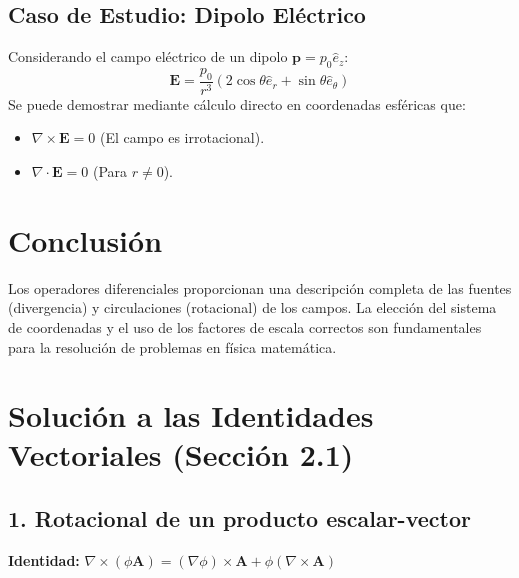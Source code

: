 \documentclass[a4paper]{article}
\begin{document}
\subsection{Caso de Estudio: Dipolo Eléctrico}
Considerando el campo eléctrico de un dipolo $\mathbf{p} = p_0 \hat{e}_z$:
\begin{equation}
    \mathbf{E} = \frac{p_0}{r^3} (2\cos\theta \hat{e}_r + \sin\theta \hat{e}_\theta)
\end{equation}
Se puede demostrar mediante cálculo directo en coordenadas esféricas que:
\begin{itemize}
    \item $\nabla \times \mathbf{E} = 0$ (El campo es irrotacional).
    \item $\nabla \cdot \mathbf{E} = 0$ (Para $r \neq 0$).
\end{itemize}

\section{Conclusión}
Los operadores diferenciales proporcionan una descripción completa de las fuentes (divergencia) y circulaciones (rotacional) de los campos. La elección del sistema de coordenadas y el uso de los factores de escala correctos son fundamentales para la resolución de problemas en física matemática.

\section*{Solución a las Identidades Vectoriales (Sección 2.1)}

\subsection*{1. Rotacional de un producto escalar-vector}
\textbf{Identidad:} $\nabla \times (\phi \mathbf{A}) = (\nabla \phi) \times \mathbf{A} + \phi (\nabla \times \mathbf{A})$
\end{document}
